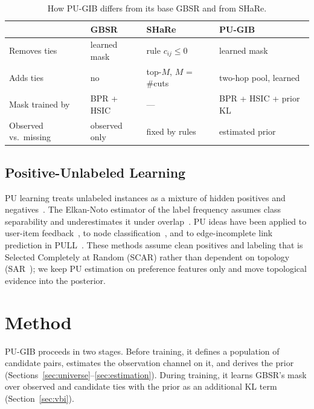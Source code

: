 \documentclass[sigconf]{acmart}
\begin{document}
\begin{table}[t]
\caption{How PU-GIB differs from its base GBSR and from SHaRe.}
\label{tab:comparison}
\small
\setlength{\tabcolsep}{3pt}
\begin{tabular}{@{}>{\raggedright\arraybackslash}p{}>{\raggedright\arraybackslash}p{}>{\raggedright\arraybackslash}p{}>{\raggedright\arraybackslash}p{}@{}}
\toprule
 & GBSR & SHaRe & PU-GIB \\
\midrule
Removes ties & learned mask & rule $c_{ij} \le 0$ & learned mask \\
Adds ties & no & top-$M$, $M$ = \#cuts & two-hop pool, learned \\
Mask trained by & BPR + HSIC & --- & BPR + HSIC + prior KL \\
Observed vs.\ missing & observed only & fixed by rules & estimated prior \\
\bottomrule
\end{tabular}
\end{table}

\subsection{Positive-Unlabeled Learning}
PU learning treats unlabeled instances as a mixture of hidden positives and negatives~\cite{10.1145/1401890.1401920, bekker2020learning, kiryo2017positive}. The Elkan-Noto estimator of the label frequency assumes class separability and underestimates it under overlap~\cite{bekker2020learning, lazecka2021estimating}. PU ideas have been applied to user-item feedback~\cite{hsieh2015pu, saito2020unbiased}, to node classification~\cite{10.1145/3450316, 9679099}, and to edge-incomplete link prediction in PULL~\cite{10.1609/aaai.v39i17.33966}. These methods assume clean positives and labeling that is Selected Completely at Random (SCAR) rather than dependent on topology (SAR~\cite{bekker2019beyond}); we keep PU estimation on preference features only and move topological evidence into the posterior.

\section{Method}
PU-GIB proceeds in two stages. Before training, it defines a population of candidate pairs, estimates the observation channel on it, and derives the prior (Sections~\ref{sec:universe}--\ref{sec:estimation}). During training, it learns GBSR's mask over observed and candidate ties with the prior as an additional KL term (Section~\ref{sec:vbi}).
\end{document}
